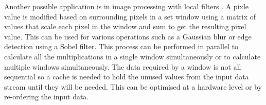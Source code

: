 Another possible application is in image processing with local filters \cite{image_process}. A pixle value is modified based on surrounding pixels in a set window using a matrix of values that scale each pixel in the window and sum to get the resulting pixel value. This can be used for various operations such as a Gaussian blur or edge detection using a Sobel filter. This process can be performed in parallel to calculate all the multiplications in a single window simultaneously or to calculate multiple windows simultaneously. The data required by a window is not all sequential so a cache is needed to hold the unused values from the input data stream until they will be needed. This can be optimised at a hardware level or by re-ordering the input data.
